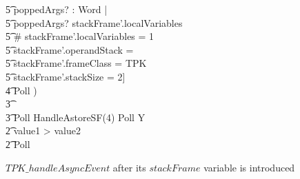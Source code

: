 \begin{figure}[tp!]
\begin{circusaction}
    \t5 poppedArgs? : \seq Word | \\
    \t5 poppedArgs? \subseteq stackFrame'.localVariables \land \\
    \t5 \# stackFrame'.localVariables = 1 \land \\
    \t5 stackFrame'.operandStack = \langle\rangle \land \\
    \t5 stackFrame'.frameClass = TPK \land \\
    \t5 stackFrame'.stackSize = 2] \rschexpract \circseq \\
    \t4 Poll \circseq \cdots ) \\
    \t3 {} \cdots {} \\
    \t3 Poll \circseq HandleAstoreSF(4) \circseq Poll \circseq Y \\
    \t2 {} \circelse value1 > value2 \circthen \Skip \\
    \t2 \circfi \circseq Poll
  \end{circusaction}
  \caption{$TPK\_handleAsyncEvent$ after its $stackFrame$ variable is
    introduced}
  \label{efs-localise-stack-frames-example-figure}
\end{figure}